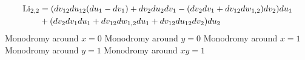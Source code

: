 \documentclass[main]{subfiles}
\begin{document}
\begin{align*}
\operatorname{Li}_{2,2}&=(dv_{12}du_{12}(du_1-dv_1)+dv_2du_2dv_1-(dv_2dv_1+dv_{12}dw_{1,2})dv_2)du_1 \\
&+(dv_2dv_1du_1+dv_{12}dw_{1,2}du_1+dv_{12}du_{12}dv_2)du_2
\end{align*}
Monodromy around $x=0$
Monodromy around $y=0$
Monodromy around $x=1$
Monodromy around $y=1$
Monodromy around $xy=1$
\end{document}
